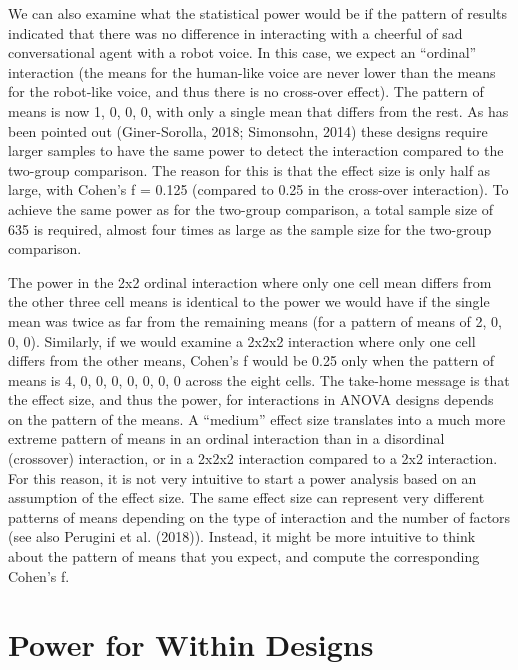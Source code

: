 \documentclass[,jou, draftfirst, a4paper,floatsintext]{apa6}
\begin{document}
We can also examine what the statistical power would be if the pattern of results indicated that there was no difference in interacting with a cheerful of sad conversational agent with a robot voice.
In this case, we expect an \enquote{ordinal} interaction (the means for the human-like voice are never lower than the means for the robot-like voice, and thus there is no cross-over effect).
The pattern of means is now 1, 0, 0, 0, with only a single mean that differs from the rest.
As has been pointed out (Giner-Sorolla, 2018; Simonsohn, 2014) these designs require larger samples to have the same power to detect the interaction compared to the two-group comparison.
The reason for this is that the effect size is only half as large, with Cohen's f = 0.125 (compared to 0.25 in the cross-over interaction).
To achieve the same power as for the two-group comparison, a total sample size of 635 is required, almost four times as large as the sample size for the two-group comparison.

The power in the 2x2 ordinal interaction where only one cell mean differs from the other three cell means is identical to the power we would have if the single mean was twice as far from the remaining means (for a pattern of means of 2, 0, 0, 0).
Similarly, if we would examine a 2x2x2 interaction where only one cell differs from the other means, Cohen's f would be 0.25 only when the pattern of means is 4, 0, 0, 0, 0, 0, 0, 0 across the eight cells. The take-home message is that the effect size, and thus the power, for interactions in ANOVA designs depends on the pattern of the means.
A \enquote{medium} effect size translates into a much more extreme pattern of means in an ordinal interaction than in a disordinal (crossover) interaction, or in a 2x2x2 interaction compared to a 2x2 interaction.
For this reason, it is not very intuitive to start a power analysis based on an assumption of the effect size.
The same effect size can represent very different patterns of means depending on the type of interaction and the number of factors (see also Perugini et al. (2018)).
Instead, it might be more intuitive to think about the pattern of means that you expect, and compute the corresponding Cohen's f.~

\hypertarget{power-for-within-designs}{%
\section{Power for Within Designs}\label{power-for-within-designs}}
\end{document}
